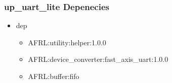 \subsubsection{up\_uart\_lite Depenecies}
\begin{itemize}
\item dep
	\begin{itemize}
	\item AFRL:utility:helper:1.0.0
	\item AFRL:device\_converter:fast\_axis\_uart:1.0.0
	\item AFRL:buffer:fifo
	\end{itemize}
\end{itemize}
